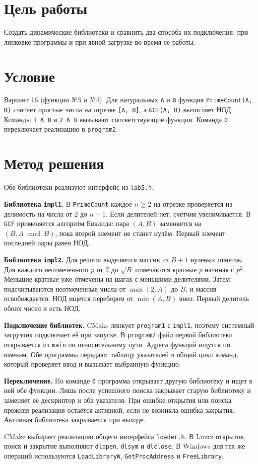 \section{Цель работы}

Создать динамические библиотеки и сравнить два способа их подключения:
при линковке программы и при явной загрузке во время её работы.

\section{Условие}

Вариант 16 (функции №3 и №4). Для натуральных \texttt{A} и \texttt{B}
функция \texttt{PrimeCount(A, B)} считает простые числа на отрезке
\texttt{[A, B]}, а \texttt{GCF(A, B)} вычисляет НОД.
Команды \texttt{1 A B} и \texttt{2 A B} вызывают соответствующие функции.
Команда \texttt{0} переключает реализацию в \texttt{program2}.

\section{Метод решения}

Обе библиотеки реализуют интерфейс из \texttt{lab5.h}.

\textbf{Библиотека \texttt{impl1}.}
В \texttt{PrimeCount} каждое $n \geq 2$ на отрезке проверяется на делимость
на числа от $2$ до $n-1$. Если делителей нет, счётчик увеличивается.
В \texttt{GCF} применяется алгоритм Евклида: пара $(A,B)$ заменяется на
$(B,A\bmod B)$, пока второй элемент не станет нулём. Первый элемент
последней пары равен НОД.

\textbf{Библиотека \texttt{impl2}.}
Для решета выделяется массив из $B+1$ нулевых отметок. Для каждого
неотмеченного $p$ от $2$ до $\sqrt{B}$ отмечаются кратные $p$ начиная с $p^2$.
Меньшие кратные уже отмечены на шагах с меньшими делителями.
Затем подсчитываются неотмеченные числа от $\max(2,A)$ до $B$, и массив
освобождается. НОД ищется перебором от $\min(A,B)$ вниз. Первый делитель
обоих чисел и есть НОД.

\textbf{Подключение библиотек.}
CMake линкует \texttt{program1} с \texttt{impl1}, поэтому системный
загрузчик подключает её при запуске. В \texttt{program2} файл первой
библиотеки открывается из \texttt{main} по относительному пути.
Адреса функций ищутся по именам. Обе программы передают таблицу
указателей в общий цикл команд, который проверяет ввод и вызывает
выбранную функцию.

\textbf{Переключение.}
По команде \texttt{0} программа открывает другую библиотеку и ищет в ней
обе функции. Лишь после успешного поиска закрывает старую библиотеку
и заменяет её дескриптор и оба указателя. При ошибке открытия или поиска
прежняя реализация остаётся активной, если не возникла ошибка закрытия.
Активная библиотека закрывается при выходе.

CMake выбирает реализацию общего интерфейса \texttt{loader.h}.
В Linux открытие, поиск и закрытие выполняют \texttt{dlopen},
\texttt{dlsym} и \texttt{dlclose}. В Windows для тех же операций
используются \texttt{LoadLibraryW}, \texttt{GetProcAddress} и \texttt{FreeLibrary}.
